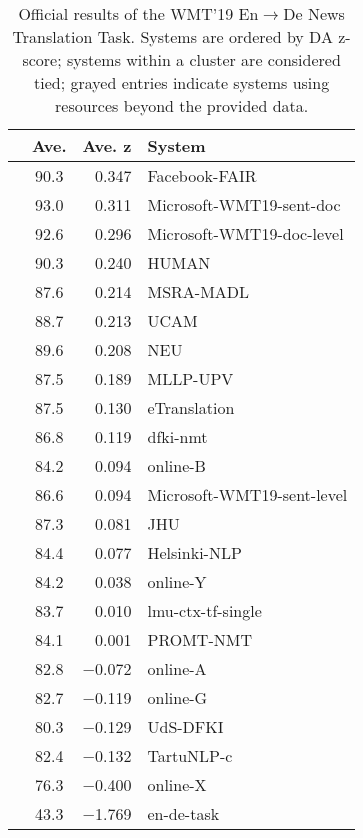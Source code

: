 \documentclass[11pt,a4paper]{article}
\newcommand{\entode}{En$\rightarrow$De}
\def\Const{\rowcolor{white}}
\def\UnCon{\rowcolor{lightgray}}
\begin{document}
\begin{table}[t]
\small
\centering
\begin{tabular}{ccrl}
 & Ave. & Ave. z & System\\ \hline
\Const{} & 90.3 & 0.347 & Facebook-FAIR \\ \hline
\Const{} & 93.0 & 0.311 & Microsoft-WMT19-sent-doc \\
\Const{} & 92.6 & 0.296 & Microsoft-WMT19-doc-level \\
\UnCon{} & 90.3 & 0.240 & HUMAN \\
\Const{} & 87.6 & 0.214 & MSRA-MADL \\
\Const{} & 88.7 & 0.213 & UCAM \\
\Const{} & 89.6 & 0.208 & NEU \\
\Const{} & 87.5 & 0.189 & MLLP-UPV \\
\Const{} & 87.5 & 0.130 & eTranslation \\
\Const{} & 86.8 & 0.119 & dfki-nmt \\
\UnCon{} & 84.2 & 0.094 & online-B \\
\Const{} & 86.6 & 0.094 & Microsoft-WMT19-sent-level \\
\Const{} & 87.3 & 0.081 & JHU \\
\Const{} & 84.4 & 0.077 & Helsinki-NLP \\
\UnCon{} & 84.2 & 0.038 & online-Y \\
\Const{} & 83.7 & 0.010 & lmu-ctx-tf-single \\
\UnCon{} & 84.1 & 0.001 & PROMT-NMT \\
\UnCon{} & 82.8 & $-$0.072 & online-A \\
\UnCon{} & 82.7 & $-$0.119 & online-G \\
\Const{} & 80.3 & $-$0.129 & UdS-DFKI \\
\Const{} & 82.4 & $-$0.132 & TartuNLP-c \\ \hline
\UnCon{} & 76.3 & $-$0.400 & online-X \\ \hline
\UnCon{} & 43.3 & $-$1.769 & en-de-task \\
\end{tabular}
\caption{Official results of the WMT'19 \entode{} News Translation Task. Systems are ordered by DA z-score; systems within a cluster are considered tied; grayed entries indicate systems using resources beyond the provided data.}
\label{tab:ende_human}
\end{table}




 
\end{document}
